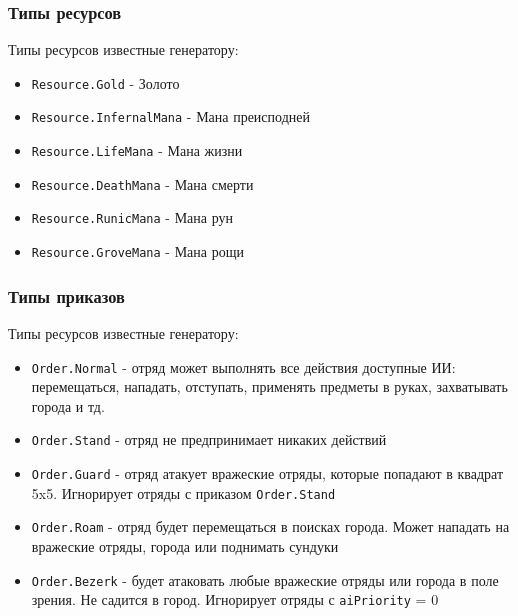 \subsubsection{Типы ресурсов}
\label{resourceTypes}
Типы ресурсов известные генератору:
\begin{itemize}
\item \texttt{Resource.Gold} - Золото
\item \texttt{Resource.InfernalMana} - Мана преисподней
\item \texttt{Resource.LifeMana} - Мана жизни
\item \texttt{Resource.DeathMana} - Мана смерти
\item \texttt{Resource.RunicMana} - Мана рун
\item \texttt{Resource.GroveMana} - Мана рощи
\end{itemize}

\subsubsection{Типы приказов}
\label{orderTypes}
Типы ресурсов известные генератору:
\begin{itemize}
\item \texttt{Order.Normal} - отряд может выполнять все действия доступные ИИ: перемещаться, нападать, отступать, применять предметы в руках, захватывать города и тд.
\item \texttt{Order.Stand} - отряд не предпринимает никаких действий
\item \texttt{Order.Guard} - отряд атакует вражеские отряды, которые попадают в квадрат 5x5. Игнорирует отряды с приказом \texttt{Order.Stand}
\item \texttt{Order.Roam} - отряд будет перемещаться в поисках города. Может нападать на вражеские отряды, города или поднимать сундуки
\item \texttt{Order.Bezerk} - будет атаковать любые вражеские отряды или города в поле зрения. Не садится в город. Игнорирует отряды с \texttt{aiPriority} = 0
\end{itemize}